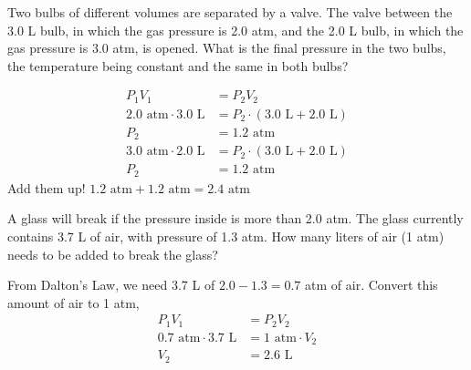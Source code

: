 \documentclass{article}
\begin{document}
\begin{custom-big}
Two bulbs of different volumes are separated by a valve. The valve between the 3.0 L bulb, in which the gas pressure is 2.0 atm, and the 2.0 L bulb, in which the gas pressure is 3.0 atm, is opened. What is the final pressure in the two bulbs, the temperature being constant and the same in both bulbs?
\end{custom-big}
\begin{solution}
\begin{align*}
    P_1V_1&=P_2V_2\\
    2.0\text{ atm}\cdot 3.0\text{ L}&=P_2\cdot (3.0\text{ L}+2.0\text{ L})\\
    P_2&=1.2\text{ atm}\\
    3.0\text{ atm}\cdot 2.0\text{ L}&=P_2\cdot (3.0\text{ L}+2.0\text{ L})\\
    P_2&=1.2\text{ atm}
\end{align*}
Add them up! $1.2\text{ atm}+1.2\text{ atm}=2.4\text{ atm}$
\end{solution}


\begin{custom-big}
A glass will break if the pressure inside is more than 2.0 atm. The glass currently contains 3.7 L of air, with pressure of 1.3 atm. How many liters of air (1 atm) needs to be added to break the glass?
\end{custom-big}
\begin{solution}
From Dalton's Law, we need 3.7 L of  $2.0-1.3=0.7$ atm of air. Convert this amount of air to 1 atm,
\begin{align*}
    P_1V_1&=P_2V_2\\
    0.7\text{ atm}\cdot 3.7\text{ L}&=1\text{ atm}\cdot V_2\\
    V_2&=2.6\text{ L}
\end{align*}
\end{solution}
\end{document}
